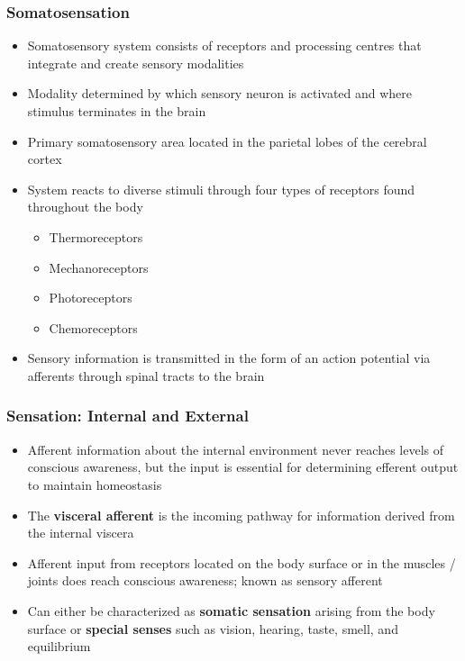 \documentclass[11pt]{article}
\begin{document}
\subsubsection{Somatosensation}
\begin{itemize}
\item Somatosensory system consists of receptors and processing centres that integrate and create sensory modalities
\item Modality determined by which sensory neuron is activated and where stimulus terminates in the brain 
\item Primary somatosensory area located in the parietal lobes of the cerebral cortex
\item System reacts to diverse stimuli through four types of receptors found throughout the body
\begin{itemize}
\item Thermoreceptors
\item Mechanoreceptors
\item Photoreceptors
\item Chemoreceptors
\end{itemize}
\item Sensory information is transmitted in the form of an action potential via afferents through spinal tracts to the brain
\end{itemize}
\subsubsection{Sensation: Internal and External}
\begin{itemize}
\item Afferent information about the internal environment  never reaches levels of conscious awareness, but the input is essential for determining efferent output to maintain homeostasis
\item The \textbf{visceral afferent} is the incoming pathway for information derived from the internal viscera
\item Afferent input from receptors located on the body surface or in the muscles / joints does reach conscious awareness; known as sensory afferent
\item Can either be characterized as \textbf{somatic sensation} arising from the body surface or \textbf{special senses} such as vision, hearing, taste, smell, and equilibrium
\end{itemize}
\end{document}
